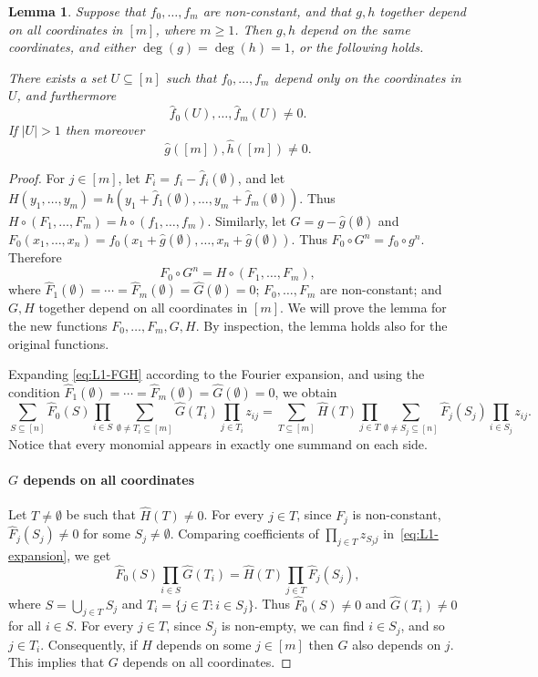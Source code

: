\documentclass{article}
\newtheorem{lemma}[theorem]{Lemma}
\theoremstyle{definition}
\theoremstyle{remark}
\renewcommand\geq{\geqslant}
\begin{document}
\begin{lemma} \label{lem:junta-variables}
Suppose that $f_0,\ldots,f_m$ are non-constant, and that $g,h$ together depend on all coordinates in $[m]$, where $m \geq 1$. Then $g,h$ depend on the same coordinates, and either $\deg(g) = \deg(h) = 1$, or the following holds.

There exists a set $U \subseteq [n]$ such that $f_0,\ldots,f_m$ depend only on the coordinates in $U$, and furthermore
\[
 \hat{f}_0(U),\ldots,\hat{f}_m(U) \neq 0.
\]
If $|U|>1$ then moreover
\[
 \hat{g}([m]),\hat{h}([m]) \neq 0.
\]
\end{lemma}
\begin{proof}
For $j \in [m]$, let $F_i = f_i - \hat{f}_i(\emptyset)$, and let $H(y_1,\ldots,y_m) = h(y_1 + \hat{f}_1(\emptyset), \ldots, y_m + \hat{f}_m(\emptyset))$. Thus $H \circ (F_1,\ldots,F_m) = h \circ (f_1,\ldots,f_m)$. Similarly, let $G = g - \hat{g}(\emptyset)$ and $F_0(x_1,\ldots,x_n) = f_0(x_1 + \hat{g}(\emptyset), \ldots, x_n + \hat{g}(\emptyset))$. Thus $F_0 \circ G^n = f_0 \circ g^n$. Therefore
\begin{equation} \label{eq:L1-FGH}
 F_0 \circ G^n = H \circ (F_1,\ldots,F_m),
\end{equation}
where $\hat{F}_1(\emptyset) = \cdots = \hat{F}_m(\emptyset) = \hat{G}(\emptyset) = 0$; $F_0,\ldots,F_m$ are non-constant; and $G,H$ together depend on all coordinates in $[m]$. We will prove the lemma for the new functions $F_0,\ldots,F_m,G,H$. By inspection, the lemma holds also for the original functions.

Expanding \eqref{eq:L1-FGH} according to the Fourier expansion, and using the condition $\hat{F}_1(\emptyset) = \cdots = \hat{F}_m(\emptyset) = \hat{G}(\emptyset) = 0$, we obtain
\begin{equation} \label{eq:L1-expansion}
 \sum_{S \subseteq [n]} \hat{F}_0(S) \prod_{i \in S} \sum_{\emptyset \neq T_i \subseteq [m]} \hat{G}(T_i) \prod_{j \in T_i} z_{ij} =
 \sum_{T \subseteq [m]} \hat{H}(T) \prod_{j \in T} \sum_{\emptyset \neq S_j \subseteq [n]} \hat{F}_j(S_j) \prod_{i \in S_j} z_{ij}.
\end{equation}
Notice that every monomial appears in exactly one summand on each side.

\paragraph{$G$ depends on all coordinates}
Let $T \neq \emptyset$ be such that $\hat{H}(T) \neq 0$. For every $j \in T$, since $F_j$ is non-constant, $\hat{F}_j(S_j) \neq 0$ for some $S_j \neq \emptyset$. Comparing coefficients of $\prod_{j \in T} z_{S_jj}$ in~\eqref{eq:L1-expansion}, we get
\[
 \hat{F}_0(S) \prod_{i \in S} \hat{G}(T_i) = \hat{H}(T) \prod_{j \in T} \hat{F}_j(S_j),
\]
where $S = \bigcup_{j \in T} S_j$ and $T_i = \{ j \in T : i \in S_j \}$. Thus $\hat{F}_0(S) \neq 0$ and $\hat{G}(T_i) \neq 0$ for all $i \in S$. For every $j \in T$, since $S_j$ is non-empty, we can find $i \in S_j$, and so $j \in T_i$. Consequently, if $H$ depends on some $j \in [m]$ then $G$ also depends on $j$. This implies that $G$ depends on all coordinates.


\end{proof}
\end{document}
